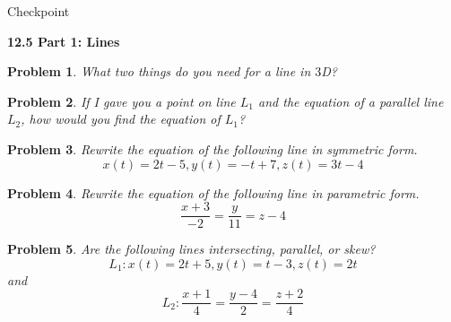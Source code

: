 \documentclass[11pt]{article}
\newtheorem{problem}{Problem}
\newcommand{\vs}{\vspace*{.1in}}
\begin{document}
\begin{huge}
    \begin{center}
        Checkpoint
    \end{center}
\end{huge}
\begin{large}\begin{center}\bf 12.5 Part 1: Lines\end{center}
\end{large}

\vs\vs

\begin{problem}
What two things do you need for a line in $3$D?  
\end{problem}

\begin{problem}
If I gave you a point on line $L_1$ and the equation of a parallel line $L_2$, how would you find the equation of $L_1$?
\end{problem}

\begin{problem}
Rewrite the equation of the following line in symmetric form. \[x(t) = 2t-5, y(t) = -t+7, z(t) = 3t-4\]
\end{problem}

\begin{problem}
    Rewrite the equation of the following line in parametric form. \[\frac{x+3}{-2} = \frac{y}{11} = z-4\]
\end{problem}

\begin{problem}
Are the following lines intersecting, parallel, or skew?
\[L_1: x(t) = 2t+5, y(t) = t-3, z(t) = 2t\] and \[L_2: \frac{x+1}{4}= \frac{y-4}{2} = \frac{z+2}{4}\]
\end{problem}
\end{document}
